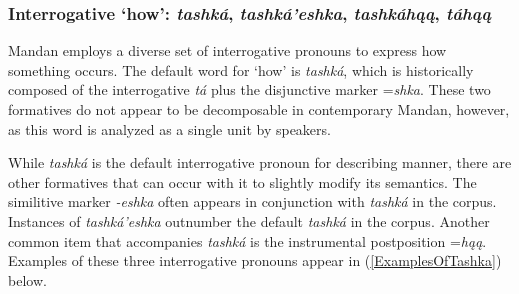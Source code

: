 \subsubsection{Interrogative `how': \textit{tashká}, \textit{tashká'eshka}, \textit{tashkáhąą}, \textit{táhąą}}\label{SubSubSecTashka}

Mandan employs a diverse set of interrogative pronouns to express how something occurs. The default word for `how' is \textit{tashká}, which is historically composed of the interrogative \textit{tá} plus the disjunctive marker =\textit{shka}. These two formatives do not appear to be decomposable in contemporary Mandan, however, as this word is analyzed as a single unit by speakers. 

While \textit{tashká} is the default interrogative pronoun for describing manner, there are other formatives that can occur with it to slightly modify its semantics. The similitive marker \textit{-eshka} often appears in conjunction with \textit{tashká} in the corpus. Instances of \textit{tashká'eshka} outnumber the default \textit{tashká} in the corpus. Another common item that accompanies \textit{tashká} is the instrumental postposition =\textit{hąą}. Examples of these three interrogative pronouns appear in (\ref{ExamplesOfTashka}) below.



